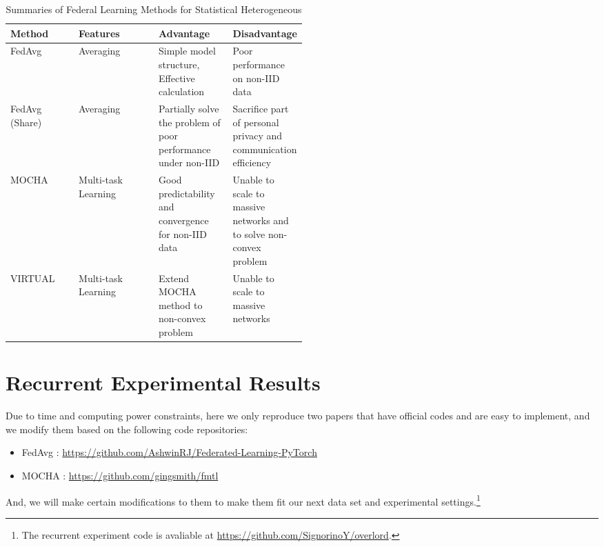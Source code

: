 \documentclass[a4paper,12pt,authoryear]{elegantpaper}
\begin{document}
\begin{table}[hpt]
    \centering
    \caption{Summaries of Federal Learning Methods for Statistical Heterogeneous}
    \label{table:summaries}
    \begin{tabular}{llp{0.25\linewidth}p{0.25\linewidth}}
        \toprule
        Method         & Features            & Advantage                                                     & Disadvantage                                                        \\
        \midrule
        FedAvg         & Averaging           & Simple model structure, Effective calculation                 & Poor performance on non-IID data                                    \\
        FedAvg (Share) & Averaging           & Partially solve the problem of poor performance under non-IID & Sacrifice part of personal privacy and communication efficiency     \\
        MOCHA          & Multi-task Learning & Good predictability and convergence for non-IID data          & Unable to scale to massive networks and to solve non-convex problem \\
        VIRTUAL        & Multi-task Learning & Extend MOCHA method to non-convex problem                     & Unable to scale to massive networks                                 \\
        \bottomrule
    \end{tabular}
\end{table}

\section{Recurrent Experimental Results}

Due to time and computing power constraints, here we only reproduce two papers \citep{mcmahan_communication-efficient_2017,smith_federated_2017} that have official codes and are easy to implement, and we modify them based on the following code repositories:
\begin{itemize}
    \item FedAvg \citep{jadhav_ashwinrjfederated-learning-pytorch_2021}: \url{https://github.com/AshwinRJ/Federated-Learning-PyTorch}
    \item MOCHA \citep{gingsmith_gingsmithfmtl_2021}: \url{https://github.com/gingsmith/fmtl}
\end{itemize}
And, we will make certain modifications to them to make them fit our next data set and experimental settings.\footnote{The recurrent experiment code is avaliable at \url{https://github.com/SignorinoY/overlord}.}
\end{document}
